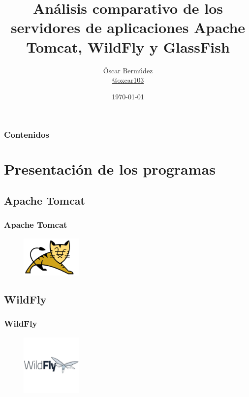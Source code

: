 \documentclass[12pt, aspectratio=169]{beamer} %
\title[Análisis de TC, WF y GF]{Análisis comparativo de los servidores de aplicaciones
Apache Tomcat, WildFly y GlassFish} %
\author[Óscar Bermúdez]{
	Óscar Bermúdez\\	
	\href{http://www.github.com/oxcar103}{@oxcar103}
} %
\institute[UGR] %
{
  Universidad de Granada \\ %
}
\date{\today} %
\begin{document}
\begin{frame}
	\titlepage %
\end{frame}

\begin{frame}
  \frametitle{Contenidos} %
  \tableofcontents
\end{frame}





\section{Presentación de los programas}
	\subsection{Apache Tomcat}
		\begin{frame}
			\frametitle{Apache Tomcat}
			
			\begin{figure}
				\includegraphics[width=3cm]{Tomcat_logo.jpg}
			\end{figure} 
		\end{frame}
	
	\subsection{WildFly}
		\begin{frame}
			\frametitle{WildFly}
			
			\begin{figure}
				\includegraphics[width=3cm]{WildFly_logo.jpg}
			\end{figure} 
		\end{frame}
	
\end{document}
